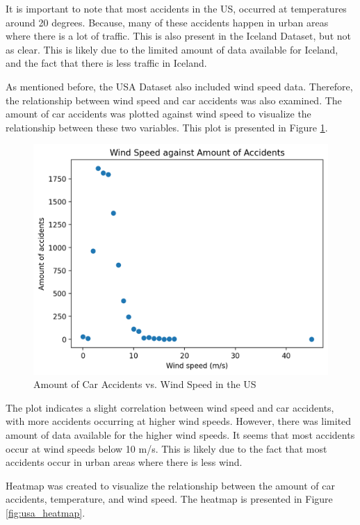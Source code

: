 \documentclass{article}
\begin{document}
It is important to note that most accidents in the US, occurred at temperatures around 20 degrees. Because, many of these accidents happen in urban areas where there is a lot of traffic. This is also present in the Iceland Dataset, but not as clear. This is likely due to the limited amount of data available for Iceland, and the fact that there is less traffic in Iceland.

As mentioned before, the USA Dataset also included wind speed data. Therefore, the relationship between wind speed and car accidents was also examined. The amount of car accidents was plotted against wind speed to visualize the relationship between these two variables. This plot is presented in Figure \ref{fig:usa_accidents_vs_wind}.

\begin{figure}[h!]
    \centering
    \includegraphics[scale=0.5]{../figures/highres/usa_wind_against_accidents.png}
    \caption{Amount of Car Accidents vs. Wind Speed in the US}
    \label{fig:usa_accidents_vs_wind}
\end{figure}


The plot indicates a slight correlation between wind speed and car accidents, with more accidents occurring at higher wind speeds. However, there was limited amount of data available for the higher wind speeds. It seems that most accidents occur at wind speeds below 10 m/s. This is likely due to the fact that most accidents occur in urban areas where there is less wind.

Heatmap was created to visualize the relationship between the amount of car accidents, temperature, and wind speed. The heatmap is presented in Figure \ref{fig:usa_heatmap}.
\end{document}
